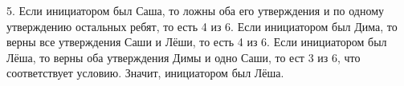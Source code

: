 5. Если инициатором был Саша, то ложны оба его утверждения и по одному утверждению остальных ребят, то есть 4 из 6. Если инициатором был Дима, то верны все утверждения Саши и Лёши, то есть 4 из 6. Если инициатором был Лёша, то верны оба утверждения Димы и одно Саши, то ест 3 из 6, что соответствует условию. Значит, инициатором был Лёша.\\

